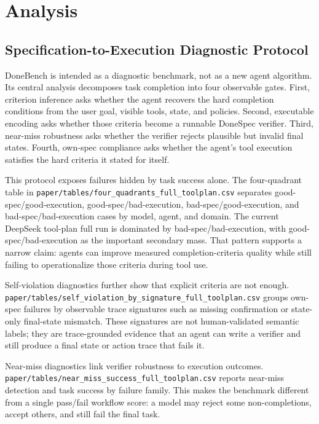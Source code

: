 \section{Analysis}

\subsection{Specification-to-Execution Diagnostic Protocol}

DoneBench is intended as a diagnostic benchmark, not as a new agent algorithm. Its central analysis decomposes task completion into four observable gates. First, criterion inference asks whether the agent recovers the hard completion conditions from the user goal, visible tools, state, and policies. Second, executable encoding asks whether those criteria become a runnable DoneSpec verifier. Third, near-miss robustness asks whether the verifier rejects plausible but invalid final states. Fourth, own-spec compliance asks whether the agent's tool execution satisfies the hard criteria it stated for itself.

This protocol exposes failures hidden by task success alone. The four-quadrant table in \texttt{paper/tables/four\_quadrants\_full\_toolplan.csv} separates good-spec/good-execution, good-spec/bad-execution, bad-spec/good-execution, and bad-spec/bad-execution cases by model, agent, and domain. The current DeepSeek tool-plan full run is dominated by bad-spec/bad-execution, with good-spec/bad-execution as the important secondary mass. That pattern supports a narrow claim: agents can improve measured completion-criteria quality while still failing to operationalize those criteria during tool use.

Self-violation diagnostics further show that explicit criteria are not enough. \texttt{paper/tables/self\_violation\_by\_signature\_full\_toolplan.csv} groups own-spec failures by observable trace signatures such as missing confirmation or state-only final-state mismatch. These signatures are not human-validated semantic labels; they are trace-grounded evidence that an agent can write a verifier and still produce a final state or action trace that fails it.

Near-miss diagnostics link verifier robustness to execution outcomes. \texttt{paper/tables/near\_miss\_success\_full\_toolplan.csv} reports near-miss detection and task success by failure family. This makes the benchmark different from a single pass/fail workflow score: a model may reject some non-completions, accept others, and still fail the final task.

